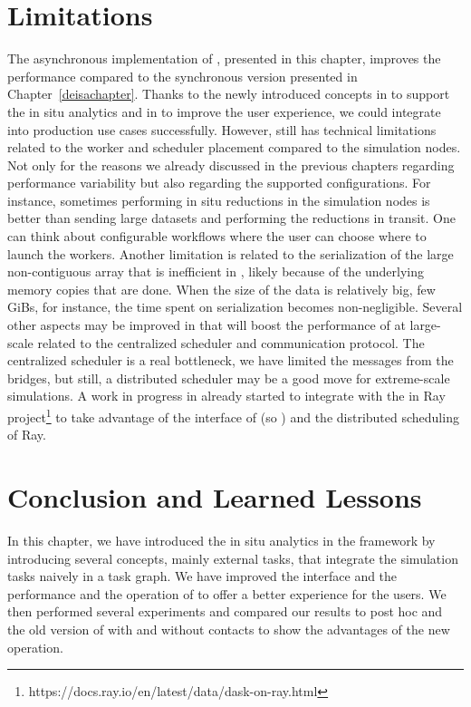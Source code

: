 
\section{Limitations}
The asynchronous implementation of \deisa, presented in this chapter, improves the performance compared to the synchronous version presented in Chapter~\ref{deisachapter}. Thanks to the newly introduced concepts in \dask to support the in situ analytics and in \deisa to improve the user experience, we could integrate \deisa into production use cases successfully. 
However, \deisa still has technical limitations related to the worker and scheduler placement compared to the simulation nodes. Not only for the reasons we already discussed in the previous chapters regarding performance variability but also regarding the supported configurations. For instance, sometimes performing in situ reductions in the simulation nodes is better than sending large datasets and performing the reductions in transit. One can think about configurable workflows where the user can choose where to launch the workers.
Another limitation is related to the serialization of the large non-contiguous array that is inefficient in \dask, likely because of the underlying memory copies that are done. When the size of the data is relatively big, few GiBs, for instance, the time spent on serialization becomes non-negligible. 
Several other aspects may be improved in \dask that will boost the performance of \deisa at large-scale related to the centralized scheduler and communication protocol. The centralized scheduler is a real bottleneck, we have limited the messages from the bridges, but still, a distributed scheduler may be a good move for extreme-scale simulations. A work in progress in already started to integrate \deisa with the \dask in Ray project\footnote{https://docs.ray.io/en/latest/data/dask-on-ray.html} to take advantage of the interface of \dask (so \deisa) and the distributed scheduling of Ray.   

\section{Conclusion and Learned Lessons}
In this chapter, we have introduced the in situ analytics in the \dask framework by introducing several concepts, mainly external tasks, that integrate the simulation tasks naively in a \dask task graph. We have improved the interface and the performance and the operation of \deisa to offer a better experience for the users.
We then performed several experiments and compared our results to post hoc and the old version of \deisa with and without contacts to show the advantages of the new operation.

